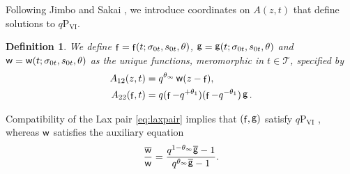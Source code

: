 \documentclass[a4paper,reqno,11pt]{amsart}
\numberwithin{equation}{section}
\numberwithin{figure}{section}
\theoremstyle{plain}
\newtheorem{definition}[theorem]{Definition}
\theoremstyle{remark}
\DeclareMathOperator{\sff}{{\sf f}}
\DeclareMathOperator{\sfg}{{\sf g}}
\DeclareMathOperator{\sfw}{{\sf w}}
\newcommand\Psix{\textrm{P}_{\textrm{VI}}}
\numberwithin{rhp}{section}
\begin{document}
Following Jimbo and Sakai \cite{jimbosakai}, we introduce coordinates  on $A(z,t)$ that define solutions to $q\Psix$.
\begin{definition}\label{def:def_sols}
We define $\sff=\sff(t;\sigma_{0t},s_{0t},\theta)$, $\sfg=\sfg(t;\sigma_{0t},s_{0t},\theta)$ and $\sfw=\sfw(t;\sigma_{0t},s_{0t},\theta)$ as the unique functions, meromorphic in $t\in\mathcal{T}$, specified by
\begin{subequations}\label{eq:coordinates_linear}
\begin{align}
    A_{12}(z,t)&=q^{\theta_\infty} \sfw(z-\sff),\\
    A_{22}(\sff,t)&=q(\sff-q^{+\theta_1})(\sff-q^{-\theta_1})\sfg.
\end{align}
\end{subequations}
\end{definition}
 Compatibility of the Lax pair \eqref{eq:laxpair} implies that $(\sff,\sfg)$ satisfy $q\Psix$ \cite{jimbosakai}, whereas $\sfw$ satisfies the auxiliary equation
\begin{equation}\label{eq:auxiliary}
    \frac{\overline{\sfw}}{\sfw}=\frac{q^{1-\theta_\infty}\overline{\sfg}-1}{q^{\theta_\infty}\overline{\sfg}-1}.
\end{equation}
\end{document}
